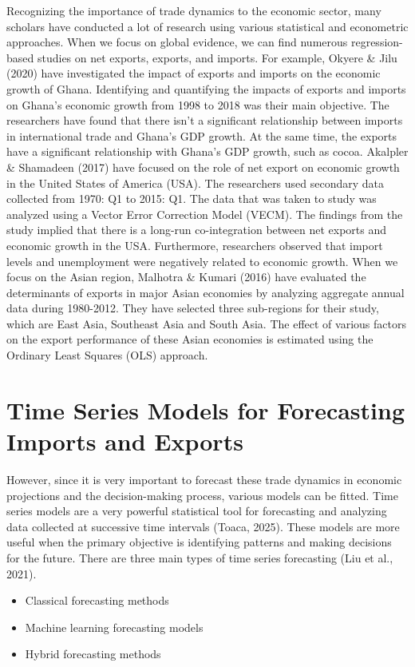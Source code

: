 \documentclass[12pt,a4paper]{report} %
\begin{document}
	Recognizing the importance of trade dynamics to the economic sector, many scholars have conducted a lot of research using various statistical and econometric approaches. When we focus on global evidence, we can find numerous regression-based studies on net exports, exports, and imports. For example, Okyere \& Jilu (2020) have investigated the impact of exports and imports on the economic growth of Ghana. Identifying and quantifying the impacts of exports and imports on Ghana’s economic growth from 1998 to 2018 was their main objective. The researchers have found that there isn’t a significant relationship between imports in international trade and Ghana’s GDP growth. At the same time, the exports have a significant relationship with Ghana’s GDP growth, such as cocoa. Akalpler \& Shamadeen (2017) have focused on the role of net export on economic growth in the United States of America (USA). The researchers used secondary data collected from 1970: Q1 to 2015: Q1. The data that was taken to study was analyzed using a Vector Error Correction Model (VECM). The findings from the study implied that there is a long-run co-integration between net exports and economic growth in the USA. Furthermore, researchers observed that import levels and unemployment were negatively related to economic growth. When we focus on the Asian region, Malhotra \& Kumari (2016) have evaluated the determinants of exports in major Asian economies by analyzing aggregate annual data during 1980-2012. They have selected three sub-regions for their study, which are East Asia, Southeast Asia and South Asia. The effect of various factors on the export performance of these Asian economies is estimated using the Ordinary Least Squares (OLS) approach. 
	
	\section{Time Series Models for Forecasting Imports and Exports}
	
	However, since it is very important to forecast these trade dynamics in economic projections and the decision-making process, various models can be fitted. Time series models are a very powerful statistical tool for forecasting and analyzing data collected at successive time intervals (Toaca, 2025). These models are more useful when the primary objective is identifying patterns and making decisions for the future. There are three main types of time series forecasting (Liu et al., 2021). 
	
	\begin{itemize}
		\item Classical forecasting methods
		\item Machine learning forecasting models
		\item Hybrid forecasting methods
	\end{itemize}
	
\end{document}
